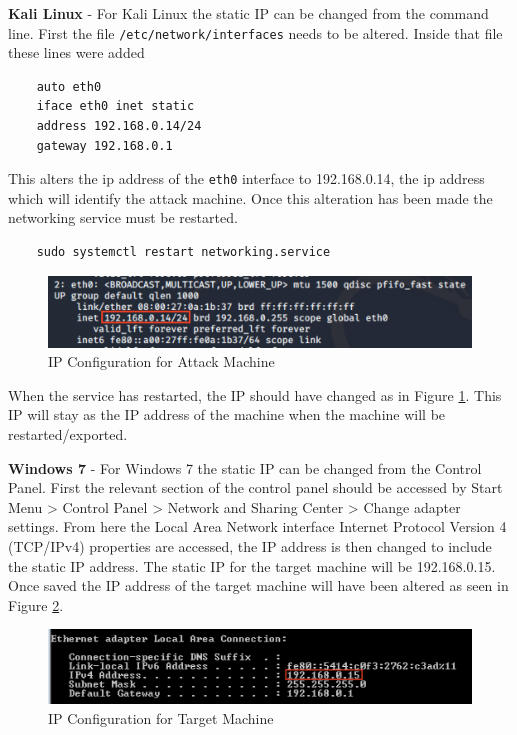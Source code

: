 \textbf{Kali Linux} - For Kali Linux the static IP can be changed from the command line. First the file  \texttt{/etc/network/interfaces} needs to be altered. Inside that file these lines were added
\begin{verbatim}
    auto eth0
    iface eth0 inet static
    address 192.168.0.14/24
    gateway 192.168.0.1
\end{verbatim}
This alters the ip address of the \texttt{eth0} interface to 192.168.0.14, the ip address which will identify the attack machine. Once this alteration has been made the networking service must be restarted.
\begin{verbatim}
    sudo systemctl restart networking.service
\end{verbatim}
\begin{figure}[h]
    \centering
    \includegraphics[scale=0.65]{Images/ip.png}
    \caption{IP Configuration for Attack Machine}
    \label{fig:ipfa}
\end{figure}
When the service has restarted, the IP should have changed as in Figure \ref{fig:ipfa}. This IP will stay as the IP address of the machine when the machine will be restarted/exported.

\textbf{Windows 7} - For Windows 7 the static IP can be changed from the Control Panel. First the relevant section of the control panel should be accessed by Start Menu > Control Panel > Network and Sharing Center > Change adapter settings. From here the Local Area Network interface  Internet Protocol Version 4 (TCP/IPv4) properties are accessed, the IP address is then changed to include the static IP address. The static IP for the target machine will be 192.168.0.15. Once saved the IP address of the target machine will have been altered as seen in Figure \ref{fig:ipft}.
\begin{figure}[h]
    \centering
    \includegraphics[scale=0.7]{Images/ip7.png}
    \caption{IP Configuration for Target Machine}
    \label{fig:ipft}
\end{figure}

